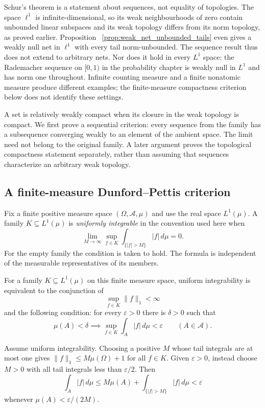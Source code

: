 Schur's theorem is a statement about sequences, not equality of
topologies. The space $\ell^1$ is infinite-dimensional, so its weak
neighbourhoods of zero contain unbounded linear subspaces and its weak topology
differs from its norm topology, as proved earlier. Proposition~
\ref{prop:weak_net_unbounded_tails} even gives a weakly null net in
$\ell^1$ with every tail norm-unbounded. The sequence result thus does
not extend to arbitrary nets. Nor does it hold in every $L^1$ space:
the Rademacher sequence on $[0,1)$ in the probability chapter is weakly
null in $L^1$ and has norm one throughout. Infinite counting measure
and a finite nonatomic measure produce different examples; the
finite-measure compactness criterion below does not identify these
settings.

A set is relatively weakly compact when its closure in the weak
topology is compact. We first prove a sequential criterion: every sequence
from the family has a subsequence converging weakly to an element of the
ambient space. The limit need not belong to the original family. A later
argument proves the topological compactness statement separately, rather
than assuming that sequences characterize an arbitrary weak topology.

\subsection{A finite-measure Dunford--Pettis criterion}
Fix a finite positive measure space $(\Omega,\mathcal{A},\mu)$ and
use the real space $L^1(\mu)$. A family $K\subseteq L^1(\mu)$ is
\emph{uniformly integrable} in the convention used here when
\[
\lim_{M\to\infty}\sup_{f\in K}
 \int_{\{|f|>M\}}|f|\,d\mu=0.
\]
For the empty family the condition is taken to hold. The formula is
independent of the measurable representatives of its members.

\begin{lemma}
For a family $K\subseteq L^1(\mu)$ on this finite measure space,
uniform integrability is equivalent to the conjunction of
\[
\sup_{f\in K}\|f\|_1<\infty
\]
and the following condition: for every $\varepsilon>0$ there is
$\delta>0$ such that
\[
\mu(A)<\delta\implies
\sup_{f\in K}\int_A|f|\,d\mu<\varepsilon
\qquad(A\in\mathcal{A}).
\]
\end{lemma}
\Proof
Assume uniform integrability. Choosing a positive $M$ whose tail
integrals are at most one gives
$\|f\|_1\leqslant M\mu(\Omega)+1$ for all $f\in K$.
Given $\varepsilon>0$, instead choose $M>0$ with all tail integrals
less than $\varepsilon/2$. Then
\[
\int_A|f|\,d\mu
\leqslant M\mu(A)+\int_{\{|f|>M\}}|f|\,d\mu
<\varepsilon
\]
whenever $\mu(A)<\varepsilon/(2M)$.

